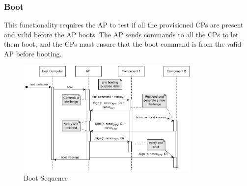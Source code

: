 \documentclass[11pt,oneside,onecolumn,letterpaper]{article}
\begin{document}
	\subsubsection{Boot}
	This functionality requires the AP to test if all the provisioned CPs are present and valid before the AP boots.
	The AP sends commands to all the CPs to let them boot,
	and the CPs must ensure that the boot command is from the valid AP before booting.
	
	\begin{figure}[h]
		\centering
		\includegraphics[width=0.8\textwidth]{pics/boot.pdf}
		\caption{Boot Sequence}
		\label{fig:functionality_boot}
	\end{figure}
	
\end{document}
